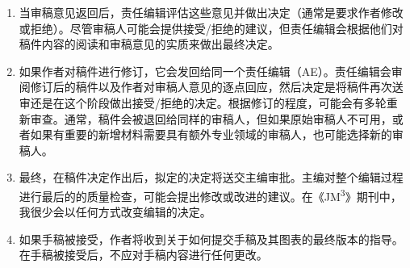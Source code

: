 \begin{enumerate}
\item 当审稿意见返回后，责任编辑评估这些意见并做出决定（通常是要求作者修改或拒绝）。尽管审稿人可能会提供接受/拒绝的建议，但责任编辑会根据他们对稿件内容的阅读和审稿意见的实质来做出最终决定。

\item 如果作者对稿件进行修订，它会发回给同一个责任编辑（AE）。责任编辑会审阅修订后的稿件以及作者对审稿人意见的逐点回应，然后决定是将稿件再次送审还是在这个阶段做出接受/拒绝的决定。根据修订的程度，可能会有多轮重新审查。通常，稿件会被退回给同样的审稿人，但如果原始审稿人不可用，或者如果有重要的新增材料需要具有额外专业领域的审稿人，也可能选择新的审稿人。

\item 最终，在稿件决定作出后，拟定的决定将送交主编审批。主编对整个编辑过程进行最后的的质量检查，可能会提出修改或改进的建议。在《JM\textsuperscript{3}》期刊中，我很少会以任何方式改变编辑的决定。

\item 如果手稿被接受，作者将收到关于如何提交手稿及其图表的最终版本的指导。在手稿被接受后，不应对手稿内容进行任何更改。


\end{enumerate}
